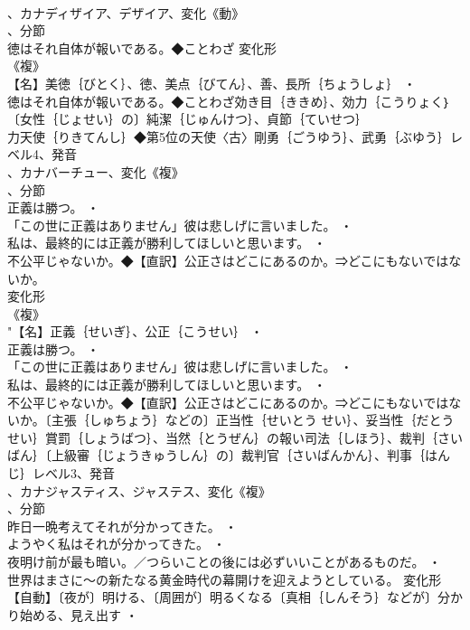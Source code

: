 \documentclass[8pt]{extreport}
\begin{document}
\begin{CJK}{UTF8}{min}
\\	、カナディザイア、デザイア、変化《動》
\\	、分節
\\	徳はそれ自体が報いである。◆ことわざ	変化形 
\\	《複》
\\	【名】美徳｛びとく｝、徳、美点｛びてん｝、善、長所｛ちょうしょ｝ ・
\\	徳はそれ自体が報いである。◆ことわざ効き目｛ききめ｝、効力｛こうりょく｝〔女性｛じょせい｝の〕純潔｛じゅんけつ｝、貞節｛ていせつ｝
\\	力天使｛りきてんし｝◆第5位の天使〈古〉剛勇｛ごうゆう｝、武勇｛ぶゆう｝レベル4、発音
\\	、カナバーチュー、変化《複》
\\	、分節
\\	正義は勝つ。 ・
\\	「この世に正義はありません」彼は悲しげに言いました。 ・
\\	私は、最終的には正義が勝利してほしいと思います。 ・
\\	不公平じゃないか。◆【直訳】公正さはどこにあるのか。⇒どこにもないではないか。
\\	変化形 
\\	《複》
\\	"【名】正義｛せいぎ｝、公正｛こうせい｝ ・
\\	正義は勝つ。 ・
\\	「この世に正義はありません」彼は悲しげに言いました。 ・
\\	私は、最終的には正義が勝利してほしいと思います。 ・
\\	不公平じゃないか。◆【直訳】公正さはどこにあるのか。⇒どこにもないではないか。〔主張｛しゅちょう｝などの〕正当性｛せいとう せい｝、妥当性｛だとう せい｝賞罰｛しょうばつ｝、当然｛とうぜん｝の報い司法｛しほう｝、裁判｛さいばん｝〔上級審｛じょうきゅうしん｝の〕裁判官｛さいばんかん｝、判事｛はんじ｝レベル3、発音
\\	、カナジャスティス、ジャステス、変化《複》
\\	、分節
\\	昨日一晩考えてそれが分かってきた。 ・
\\	ようやく私はそれが分かってきた。 ・
\\	夜明け前が最も暗い。／つらいことの後には必ずいいことがあるものだ。 ・
\\	世界はまさに～の新たなる黄金時代の幕開けを迎えようとしている。	変化形 
\\	【自動】〔夜が〕明ける、〔周囲が〕明るくなる〔真相｛しんそう｝などが〕分かり始める、見え出す ・

\end{CJK}
\end{document}

